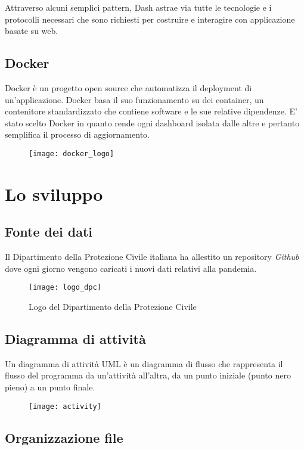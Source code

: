 \noindent Attraverso alcuni semplici pattern, Dash astrae via tutte le tecnologie e i protocolli necessari che sono richiesti per costruire e interagire con applicazione basate su web.

\subsection{Docker}
Docker è un progetto open source che automatizza il deployment di un'applicazione.
Docker basa il suo funzionamento su dei container, un contenitore standardizzato che contiene software e le sue relative dipendenze.
E' stato scelto Docker in quanto rende ogni dashboard isolata dalle altre e pertanto semplifica il processo di aggiornamento.


\begin{figure}[htp]
    \centering
    \texttt{[image: docker\_logo]}
\end{figure}

\section{Lo sviluppo}

\subsection{Fonte dei dati}
Il Dipartimento della Protezione Civile italiana ha allestito un repository \emph{Github} dove ogni giorno vengono caricati i nuovi dati relativi alla pandemia.

\begin{figure}[htp]
    \centering
    \texttt{[image: logo\_dpc]}
    \caption{Logo del Dipartimento della Protezione Civile}
\end{figure}

\subsection{Diagramma di attività}
Un diagramma di attività UML è un diagramma di flusso che rappresenta il flusso del programma da un'attività all'altra,
da un punto iniziale (punto nero pieno) a un punto finale.

\begin{figure}[htp]
    \centering
    \texttt{[image: activity]}
\end{figure}

\subsection{Organizzazione file}

